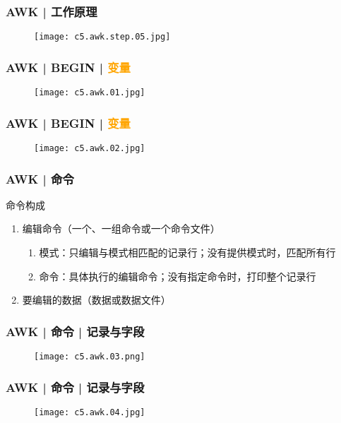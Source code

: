 \begin{frame}
  \frametitle{AWK | 工作原理}
  \begin{figure}
    \centering
    \texttt{[image: c5.awk.step.05.jpg]}
  \end{figure}
\end{frame}

\begin{frame}
  \frametitle{AWK | BEGIN | \textcolor{orange}{变量}}
  \begin{figure}
    \centering
    \texttt{[image: c5.awk.01.jpg]}
  \end{figure}
\end{frame}

\begin{frame}
  \frametitle{AWK | BEGIN | \textcolor{orange}{变量}}
  \begin{figure}
    \centering
    \texttt{[image: c5.awk.02.jpg]}
  \end{figure}
\end{frame}

\begin{frame}
  \frametitle{AWK | \alert{命令}}
  \begin{block}{命令构成}
    \begin{enumerate}
      \item 编辑命令（一个、一组命令或一个命令文件）
        \begin{enumerate}
          \item 模式：只编辑与模式相匹配的记录行；没有提供模式时，匹配所有行
          \item 命令：具体执行的编辑命令；没有指定命令时，打印整个记录行
        \end{enumerate}
      \item 要编辑的数据（数据或数据文件）
    \end{enumerate}
  \end{block}
\end{frame}

\begin{frame}
  \frametitle{AWK | 命令 | \alert{记录与字段}}
  \begin{figure}
    \centering
    \texttt{[image: c5.awk.03.png]}
  \end{figure}
\end{frame}

\begin{frame}
  \frametitle{AWK | 命令 | \alert{记录与字段}}
  \begin{figure}
    \centering
    \texttt{[image: c5.awk.04.jpg]}
  \end{figure}
\end{frame}

